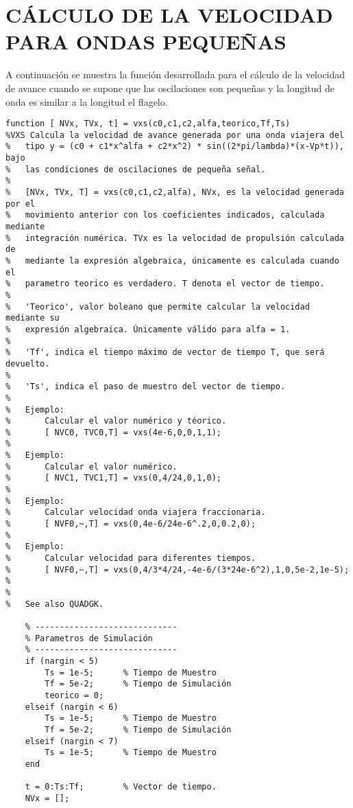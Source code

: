 \section{CÁLCULO DE LA VELOCIDAD PARA ONDAS PEQUEÑAS} \label{anex:Anexo1}
A continuación se muestra la función desarrollada para el cálculo de la velocidad de avance cuando se supone que las oscilaciones son pequeñas y la longitud de onda es similar a la longitud el flagelo.

\begin{lstlisting}[]
function [ NVx, TVx, t] = vxs(c0,c1,c2,alfa,teorico,Tf,Ts)
%VXS Calcula la velocidad de avance generada por una onda viajera del
%   tipo y = (c0 + c1*x^alfa + c2*x^2) * sin((2*pi/lambda)*(x-Vp*t)), bajo
%   las condiciones de oscilaciones de pequeña señal.
%
%   [NVx, TVx, T] = vxs(c0,c1,c2,alfa), NVx, es la velocidad generada por el
%   movimiento anterior con los coeficientes indicados, calculada mediante
%   integración numérica. TVx es la velocidad de propulsión calculada de
%   mediante la expresión algebraica, únicamente es calculada cuando el 
%   parametro teorico es verdadero. T denota el vector de tiempo.
%
%   'Teorico', valor boleano que permite calcular la velocidad mediante su
%   expresión algebraica. Únicamente válido para alfa = 1.
%
%   'Tf', indica el tiempo máximo de vector de tiempo T, que será devuelto.
%
%   'Ts', indica el paso de muestro del vector de tiempo.
%
%   Ejemplo:
%       Calcular el valor numérico y téorico.
%       [ NVC0, TVC0,T] = vxs(4e-6,0,0,1,1);
%
%   Ejemplo:
%       Calcular el valor numérico.
%       [ NVC1, TVC1,T] = vxs(0,4/24,0,1,0);
%
%   Ejemplo:
%       Calcular velocidad onda viajera fraccionaria.
%       [ NVF0,~,T] = vxs(0,4e-6/24e-6^.2,0,0.2,0);
%
%   Ejemplo:
%       Calcular velocidad para diferentes tiempos.
%       [ NVF0,~,T] = vxs(0,4/3*4/24,-4e-6/(3*24e-6^2),1,0,5e-2,1e-5);
%
%   
%   See also QUADGK.

    % -----------------------------
    % Parametros de Simulación
    % -----------------------------
    if (nargin < 5)
        Ts = 1e-5;      % Tiempo de Muestro
        Tf = 5e-2;      % Tiempo de Simulación
        teorico = 0;
    elseif (nargin < 6)
        Ts = 1e-5;      % Tiempo de Muestro
        Tf = 5e-2;      % Tiempo de Simulación    
    elseif (nargin < 7)
        Ts = 1e-5;      % Tiempo de Muestro    
    end

    t = 0:Ts:Tf;        % Vector de tiempo.
    NVx = [];


\end{lstlisting}
